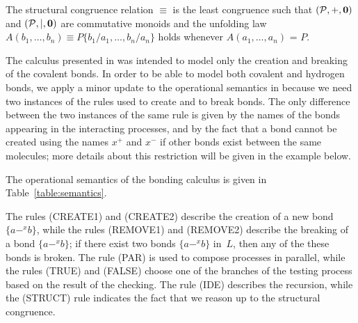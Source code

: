 \documentclass[runningheads]{llncs}
\newcommand{\mP}{\mathcal{P}}
\begin{document}
The structural congruence relation $\equiv$ is the least congruence such 
that $(\mP,+,{\bf 0})$ and $(\mP,\mid,{\bf 0})$ are commutative monoids 
and the unfolding law $A(b_1,\ldots,b_n) \equiv 
P\{b_1/a_1,\ldots,b_n/a_n\}$ holds whenever $A(a_1,\ldots,a_n)$ = $P$.

The calculus presented in \cite{NaCo18} was intended to model only the 
creation and breaking of the covalent bonds. In order to be able to model 
both covalent and hydrogen bonds, we apply a minor update to the 
operational semantics in \cite{NaCo18} because we need two instances of the 
rules used to create and to break bonds. The only difference between the 
two instances of the same rule is given by the names of the bonds 
appearing in the interacting processes, and by the fact that a bond cannot 
be created using the names $x^+$ and $x^-$ if other bonds exist between 
the same molecules; more details about this restriction will be given in 
the example below.

The operational semantics of the bonding calculus is given in Table~\ref{table:semantics}.

The rules {\sf (CREATE1)} and {\sf (CREATE2)} describe the creation of a 
new bond $\{a-^x b\}$, while the rules {\sf (REMOVE1)} and {\sf (REMOVE2)} 
describe the breaking of a bond $\{a-^x b\}$; if there exist two bonds 
$\{a-^x b\}$ in~$L$, then any of the these bonds is broken. The rule 
{\sf (PAR}) is used to compose processes in parallel, while the rules 
{\sf (TRUE}) and {\sf (FALSE}) choose one of the branches of the testing 
process based on the result of the checking. The rule {\sf (IDE)} describes 
the recursion, while the {\sf (STRUCT)} rule indicates the fact that we reason 
up to the structural congruence.
\end{document}
